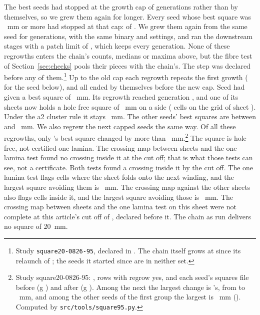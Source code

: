 The best seeds had stopped at the growth cap of \ChainGenCap{} generations rather than by themselves, so we grew them
again for longer. Every seed whose best square was \NearFiveThreshold{}~mm or more had stopped at that cap:
\RegrowAtCap{} of \RegrowSeeds{}. We grew them again from the same seed for \RegrowGenCap{} generations, with the same
binary and settings, and ran the downstream stages with a patch limit of \RegrowPatchLimit{}, which keeps every
generation. None of these regrowths enters the chain's counts, medians or maxima above, but the fibre test of
Section~\ref{sec:checks} pools their pieces with the chain's. The step was declared
before any of them.\footnote{Study \texttt{square20-0826-95}, declared in . The chain itself grows at \RegrowGenCap{} since its
relaunch of \ChainFreezeTime{}; the \ChainSeedsAfterFreeze{} seeds it started since are in neither set.} Up to the old
cap each regrowth repeats the first growth (\RegrowIdentity{} for the seed below), and all \RegrowEnded{} ended by
themselves before the new cap. Seed \RegrowBestSeed{} had given a best square of \RegrowBestBefore{}~mm. Its regrowth
reached generation \RegrowBestGeneration{}, and one of its sheets now holds a hole free square of \RegrowBest{}~mm on a
side (\RegrowBestCells{} cells on the grid of sheet \RegrowBestSheet{}). Under the a2 cluster rule it stays
\RegrowBestCluster{}~mm. The other seeds' best squares are between \RegrowOthersMin{} and \RegrowOthersMax{}~mm. We
also regrew the \RegrowNextSeeds{} next capped seeds the same way. Of all these regrowths, only \RegrowBestSeed{}'s best
square changed by more than \RegrowNextChange{}~mm.\footnote{Study square20-0826-95:
, rows with regrow yes, and each seed's squares file before (g
\ChainGenCap{}) and after (g \RegrowGenCap{}). Among the next \RegrowNextSeeds{} the largest change is
\RegrowNextChangeSeed{}'s, from \RegrowNextChangeBefore{} to \RegrowNextChangeAfter{}~mm, and among the other seeds of
the first group the largest is \RegrowOthersChange{}~mm (\RegrowOthersChangeSeed{}). Computed by
\texttt{src/tools/square95.py}.} The square is hole free, not certified one lamina.
\ifSquareChecksClean
The crossing map between sheets and the one lamina test found no crossing inside it at the cut off; that is what those
tests can see, not a certificate.
\else\ifSquareChecksCrossing
Both tests found a crossing inside it by the cut off. The one lamina test flags cells where the sheet folds onto the
next winding, and the largest square avoiding them is \CheckLaminaAvoid{}~mm. The crossing map against the other sheets
also flags cells inside it, and the largest square avoiding those is \CheckVtwoAvoid{}~mm.
\else
The crossing map between sheets and the one lamina test on this sheet were not complete at this article's cut off of
\CutoffTime{}, declared before it.
\fi\fi
The chain as run delivers no square of 20~mm.


